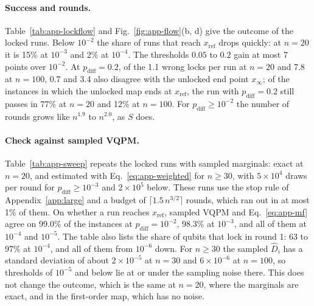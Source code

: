 \paragraph{Success and rounds.} Table~\ref{tab:app-lockflow} and Fig.~\ref{fig:app-flow}(b, d) give the outcome of the locked runs. Below $10^{-2}$ the share of runs that reach $x_{\mathrm{ref}}$ drops quickly: at $n=20$ it is 15\% at $10^{-3}$ and 2\% at $10^{-4}$. The thresholds $0.05$ to $0.2$ gain at most 7 points over $10^{-2}$. At $p_{\mathrm{diff}}=0.2$, of the 1.1 wrong locks per run at $n=20$ and 7.8 at $n=100$, 0.7 and 3.4 also disagree with the unlocked end point $x_\infty$; of the instances in which the unlocked map ends at $x_{\mathrm{ref}}$, the run with $p_{\mathrm{diff}}=0.2$ still passes in 77\% at $n=20$ and 12\% at $n=100$. For $p_{\mathrm{diff}}\ge10^{-2}$ the number of rounds grows like $n^{1.9}$ to $n^{2.0}$, as $S$ does.


\paragraph{Check against sampled VQPM.} Table~\ref{tab:app-sweep} repeats the locked runs with sampled marginals: exact at $n=20$, and estimated with Eq.~\eqref{eq:app-weighted} for $n\ge30$, with $5\times10^4$ draws per round for $p_{\mathrm{diff}}\ge10^{-3}$ and $2\times10^5$ below. These runs use the stop rule of Appendix~\ref{app:large} and a budget of $\lceil1.5\,n^{3/2}\rceil$ rounds, which ran out in at most 1\% of them. On whether a run reaches $x_{\mathrm{ref}}$, sampled VQPM and Eq.~\eqref{eq:app-mf} agree on 99.0\% of the instances at $p_{\mathrm{diff}}=10^{-2}$, 98.3\% at $10^{-3}$, and all of them at $10^{-4}$ and $10^{-5}$. The table also lists the share of qubits that lock in round 1: 63 to 97\% at $10^{-4}$, and all of them from $10^{-6}$ down. For $n\ge30$ the sampled $\hat D_i$ has a standard deviation of about $2\times10^{-5}$ at $n=30$ and $6\times10^{-6}$ at $n=100$, so thresholds of $10^{-5}$ and below lie at or under the sampling noise there. This does not change the outcome, which is the same at $n=20$, where the marginals are exact, and in the first-order map, which has no noise.

